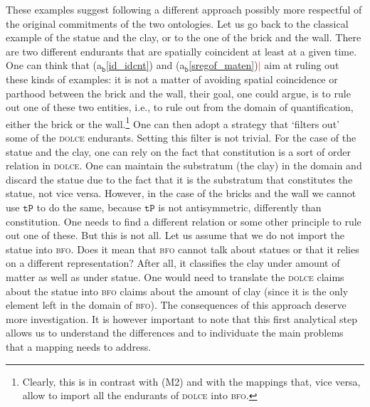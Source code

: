\documentclass[ao]{iosart2x}
\newcommand{\nb}[1]{\textcolor{red}{$|$}\marginpar{\hspace*{-0cm}\parbox{20mm}{\scriptsize\raggedright\textcolor{red}{#1}}}}
\newcommand{\bfoAxLabel}{\textrm{a$_\texttt{b}$}}
\newcommand{\refbfoax}[1]{({\bfoAxLabel}\ref{#1})}
\newcommand{\pr}[1]{\mathtt{#1}}
\newcommand{\dolce}{{\textsc{dolce}}}
\newcommand{\bfo}{{\textsc{bfo}}}
\newcommand {\TPd} {\ensuremath{\pr{tP}}}
\begin{document}
\medskip
These examples suggest following a different approach possibly more respectful of the original commitments of the two ontologies. Let us go back to the classical example of the statue and the clay, or to the one of the brick and the wall. There are two different endurants that are spatially coincident at least at a given time. One can think that \refbfoax{id_idcnt} and \refbfoax{sregof_maten}\nb{CM: forse si può fare riferimento agli ai teoremi o vice versa si possono introdurre gli assiomi e semplicemente dire che questi non valgono in dolce+def} aim at ruling out these kinds of examples: it is not a matter of avoiding spatial coincidence or parthood between the brick and the wall, their goal, one could argue, is to rule out one of these two entities, i.e., to rule out from the domain  of quantification, either the brick or the wall.\footnote{Clearly, this is in contrast with (M2) and with the mappings that, vice versa, allow to import all the endurants of {\dolce} into {\bfo}.} One can then adopt a strategy that `filters out' some of the {\dolce} endurants. Setting this filter is not trivial. For the case of the statue and the clay, one can rely on the fact that constitution is a sort of order relation in {\dolce}. One can maintain the substratum (the clay) in the domain and discard the statue due to the fact that it is the substratum that constitutes the statue, not vice versa. However, in the case of the bricks and the wall we cannot use $\TPd$ to do the same, because $\TPd$ is not antisymmetric, differently than constitution.
One needs to find a different relation or some other principle to rule out one of these. But this is not all. Let us assume that we do not import the statue into {\bfo}. Does it mean that {\bfo} cannot talk about statues or that it relies on a different representation? After all, it classifies the clay under amount of matter as well as under statue. One would need to translate the {\dolce} claims about the statue into {\bfo} claims about the amount of clay %
(since it is the only element left in the domain of {\bfo}). The consequences of this approach deserve more investigation. It is however important to note that this first analytical step allows us to understand the differences and to individuate the main problems that a mapping needs to address.
\end{document}
